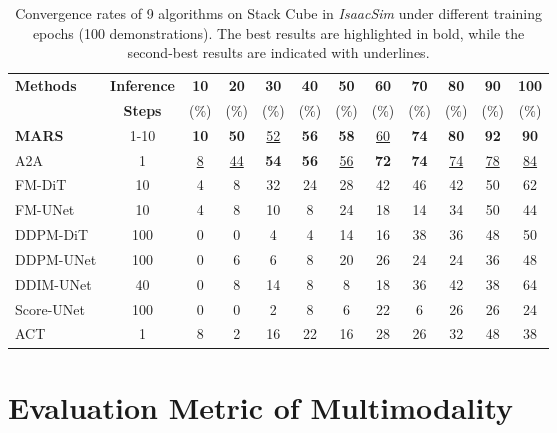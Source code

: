 \renewcommand*{\thetable}{S3}
\begin{table}[ht]
  \caption{Convergence rates of 9 algorithms on Stack Cube in \textit{IsaacSim} under different training epochs (100 demonstrations). The best results are highlighted in {bold}, while the second-best results are indicated with {underlines}.}
  \label{tab-isaacsim}
  \vspace{3mm}
  \centering
  \small
  \setlength{\tabcolsep}{3.5pt} 
  \begin{tabular}{lccccccccccc}
    \toprule
    \textbf{Methods} & \textbf{Inference} & \textbf{10} & \textbf{20} & \textbf{30} & \textbf{40} & \textbf{50} & \textbf{60} & \textbf{70} & \textbf{80} & \textbf{90} & \textbf{100} \\
    & \textbf{Steps}  & (\%) & (\%) & (\%) & (\%) & (\%) & (\%) & (\%) & (\%) & (\%) & (\%) \\
    \midrule
    \textbf{MARS} & 1-10 & \textbf{10} & \textbf{50} & \underline{52} & \textbf{56} & \textbf{58} & \underline{60} & \textbf{74} & \textbf{80} & \textbf{92} & \textbf{90} \\
    A2A                & 1 & \underline{8} & \underline{44} & \textbf{54} & \textbf{56} & \underline{56} & \textbf{72} & \textbf{74} & \underline{74} & \underline{78} & \underline{84}\\
    FM-DiT               & 10 & 4 & 8 & 32 & 24 & 28 & 42 & 46 & 42 & 50 & 62\\
    FM-UNet             & 10 & 4 & 8 & 10 & 8 & 24 & 18 & 14 & 34 & 50 & 44\\
    DDPM-DiT             & 100 & 0 & 0 & 4 & 4 & 14 & 16 & 38 & 36 & 48 & 50\\
    DDPM-UNet            & 100 & 0 & 6 & 6 & 8 & 20 & 26 & 24 & 24 & 36 & 48\\
    DDIM-UNet            & 40 & 0 & 8 & 14 & 8 & 8 & 18 & 36 & 42 & 38 & 64\\
    Score-UNet          & 100 & 0 & 0 & 2 & 8 & 6 & 22 & 6 & 26 & 26 & 24\\
    ACT                  & 1 & 8 & 2 & 16 & 22 & 16 & 28 & 26 & 32 & 48 & 38\\
    \bottomrule
  \end{tabular}
\end{table}

\section{Evaluation Metric of Multimodality}
\label{appen:metrics}

